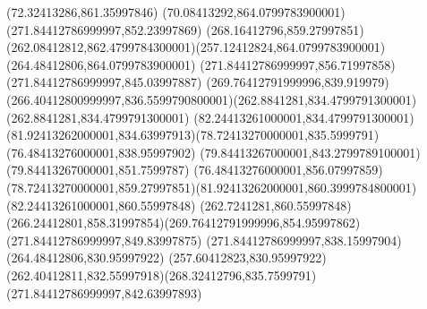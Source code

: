 {{	\lineto(72.32413286,861.35997846)
	\lineto(70.08413292,864.0799783900001)
	\closepath
	\moveto(271.84412786999997,852.23997869)
	\curveto(268.16412796,859.27997851)(262.08412812,862.4799784300001)(257.12412824,864.0799783900001)
	\lineto(264.48412806,864.0799783900001)
	\lineto(271.84412786999997,856.71997858)
	\closepath
	\moveto(271.84412786999997,845.03997887)
	\curveto(269.76412791999996,839.919979)(266.40412800999997,836.5599790800001)(262.8841281,834.4799791300001)
	\lineto(262.8841281,834.4799791300001)
	\lineto(82.24413261000001,834.4799791300001)
	\curveto(81.92413262000001,834.63997913)(78.72413270000001,835.5999791)(76.48413276000001,838.95997902)
	\lineto(79.84413267000001,843.2799789100001)
	\lineto(79.84413267000001,851.7599787)
	\lineto(76.48413276000001,856.07997859)
	\curveto(78.72413270000001,859.27997851)(81.92413262000001,860.3999784800001)(82.24413261000001,860.55997848)
	\lineto(262.7241281,860.55997848)
	\curveto(266.24412801,858.31997854)(269.76412791999996,854.95997862)(271.84412786999997,849.83997875)
	\closepath
	\moveto(271.84412786999997,838.15997904)
	\lineto(264.48412806,830.95997922)
	\lineto(257.60412823,830.95997922)
	\curveto(262.40412811,832.55997918)(268.32412796,835.7599791)(271.84412786999997,842.63997893)
	\closepath
}
}
{
}
